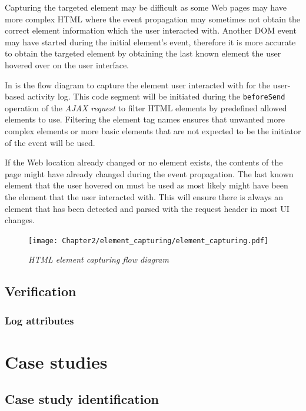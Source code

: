 Capturing the targeted element may be difficult as some Web pages may have more complex HTML where the event propagation may sometimes not obtain the correct element information which the user interacted with. Another DOM event may have started during the initial element's event, therefore it is more accurate to obtain the targeted element by obtaining the last known element the user hovered over on the user interface.\par In  is the flow diagram to capture the element user interacted with for the user-based activity log. This code segment will be initiated during the \texttt{beforeSend} operation of the \textit{AJAX request} to filter HTML elements by predefined allowed elements to use. Filtering the element tag names ensures that unwanted more complex elements or more basic elements that are not expected to be the initiator of the event will be used. \par If the Web location already changed or no element exists, the contents of the page might have already changed during the event propagation. The last known element that the user hovered on must be used as most likely might have been the element that the user interacted with. This will ensure there is always an element that has been detected and parsed with the request header in most UI changes.

\clearpage

\begin{figure}[!htb] %
	\centering %
	\texttt{[image: Chapter2/element\_capturing/element\_capturing.pdf]}
	\caption[HTML element capturing flow diagram]
	{\textit{HTML element capturing flow diagram}}\label{fig:ch2_element_event_capturing}
\end{figure}

\subsection{Verification}

\subsubsection{Log attributes}

\section{Case studies}

\subsection{Case study identification}

